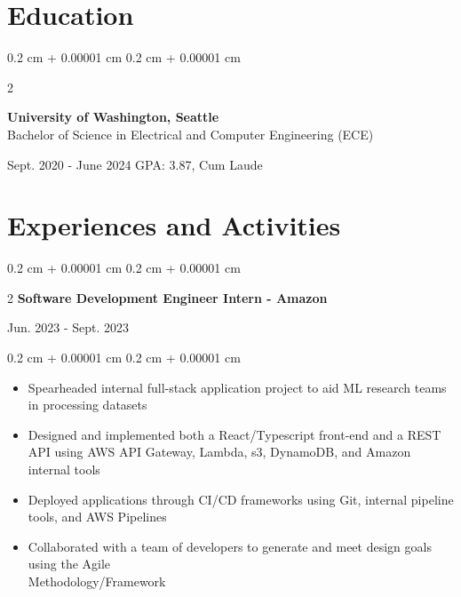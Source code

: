 \documentclass[10pt, letterpaper]{article}
\newenvironment{highlightsforbulletentries}{
    \begin{itemize}[
        topsep=0.10 cm,
        parsep=0.10 cm,
        partopsep=0pt,
        itemsep=0pt,
        leftmargin=10pt
    ]
}{
    \end{itemize}
} %
\newenvironment{onecolentry}{
    \begin{adjustwidth}{
        0.2 cm + 0.00001 cm
    }{
        0.2 cm + 0.00001 cm
    }
}{
    \end{adjustwidth}
} %
\newenvironment{twocolentry}[2][]{
    \onecolentry
    \def\secondColumn{#2}
    \setcolumnwidth{\fill, 4.5 cm}
    \begin{paracol}{2}
}{
    \switchcolumn \raggedleft \secondColumn
    \end{paracol}
    \endonecolentry
} %
\begin{document}
    \section{Education}
        \begin{twocolentry}{
            Sept. 2020 - June 2024
            GPA: 3.87, Cum Laude
        }
            \textbf{University of Washington, Seattle}\\
            Bachelor of Science in Electrical and Computer Engineering (ECE)
        \end{twocolentry}

    \section{Experiences and Activities}
        \begin{twocolentry}{
            Jun. 2023 - Sept. 2023
        }{
            \textbf{Software Development Engineer Intern - Amazon}
        }
        \end{twocolentry}
        \vspace{0.1 cm}
        \begin{onecolentry}
            \begin{highlightsforbulletentries}
                \item Spearheaded internal full-stack application project to aid ML research teams in processing
                datasets
                \item Designed and implemented both a React/Typescript front-end and a REST API using AWS API Gateway,
                Lambda, s3, DynamoDB, and Amazon internal tools
                \item Deployed applications through CI/CD frameworks using Git, internal pipeline tools, and AWS
                Pipelines
                \item Collaborated with a team of developers to generate and meet design goals using the Agile\\
                Methodology/Framework
            \end{highlightsforbulletentries}
        \end{onecolentry}

        \vspace{0.2 cm}
\end{document}

